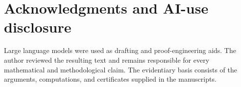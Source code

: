 \documentclass[11pt]{article}
\begin{document}
\section*{Acknowledgments and AI-use disclosure}
Large language models were used as drafting and proof-engineering aids. The
author reviewed the resulting text and remains responsible for every
mathematical and methodological claim. The evidentiary basis consists of the
arguments, computations, and certificates supplied in the manuscripts.



\end{document}
